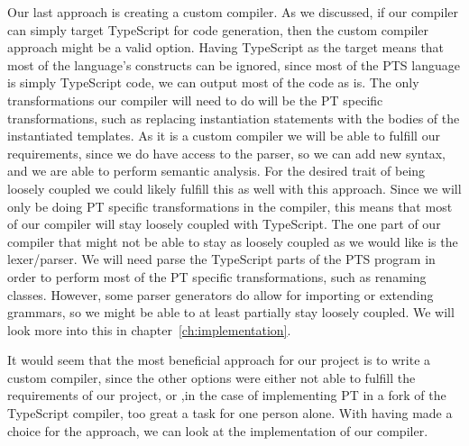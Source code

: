 Our last approach is creating a custom compiler.
As we discussed, if our compiler can simply target TypeScript for code generation, then the custom compiler approach might be a valid option.
Having TypeScript as the target means that most of the language's constructs can be ignored, since most of the PTS language is simply TypeScript code, we can output most of the code as is.
The only transformations our compiler will need to do will be the PT specific transformations, such as replacing instantiation statements with the bodies of the instantiated templates.
As it is a custom compiler we will be able to fulfill our requirements, since we do have access to the parser, so we can add new syntax, and we are able to perform semantic analysis.
For the desired trait of being loosely coupled we could likely fulfill this as well with this approach.
Since we will only be doing PT specific transformations in the compiler, this means that most of our compiler will stay loosely coupled with TypeScript.
The one part of our compiler that might not be able to stay as loosely coupled as we would like is the lexer/parser.
We will need parse the TypeScript parts of the PTS program in order to perform most of the PT specific transformations, such as renaming classes.
However, some parser generators do allow for importing or extending grammars, so we might be able to at least partially stay loosely coupled.
We will look more into this in chapter~\vref{ch:implementation}.

It would seem that the most beneficial approach for our project is to write a custom compiler, since the other options were either not able to fulfill the requirements of our project, or ,in the case of implementing PT in a fork of the TypeScript compiler, too great a task for one person alone.
With having made a choice for the approach, we can look at the implementation of our compiler.
